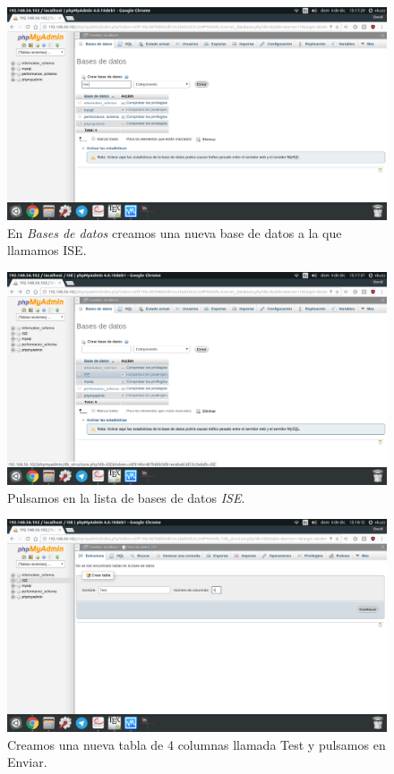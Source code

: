 \begin{figure}[H]
	\centering
	\includegraphics[scale=0.3]{mysql1.png}
	\caption{En \textit{Bases de datos} creamos una nueva base de datos a la que llamamos ISE.}
\end{figure}

\begin{figure}[H]
	\centering
	\includegraphics[scale=0.3]{mysql2.png}
	\caption{Pulsamos en la lista de bases de datos \textit{ISE}.}
\end{figure}

\begin{figure}[H]
	\centering
	\includegraphics[scale=0.3]{mysql3.png}
	\caption{Creamos una nueva tabla de 4 columnas llamada Test y pulsamos en Enviar.}
\end{figure}


